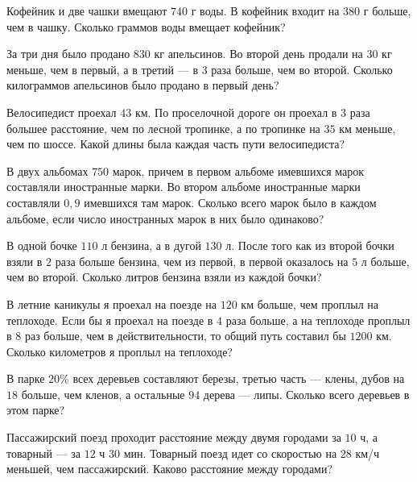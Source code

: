 \begin{consultation}
	\begin{listofex}
		\item Кофейник и две чашки вмещают \(740\) г воды. В кофейник входит на \(380\) г больше, чем в чашку. Сколько граммов воды вмещает кофейник?
		
		\item За три дня было продано \(830\) кг апельсинов. Во второй день продали на \(30\) кг меньше, чем в первый, а в третий --- в \(3\) раза больше, чем во второй. Сколько килограммов апельсинов было продано в первый день? 
		
		\item Велосипедист проехал \(43\) км. По проселочной дороге он проехал в \(3\) раза большее расстояние, чем по лесной тропинке, а по тропинке на \(35\) км меньше, чем по шоссе. Какой длины была каждая часть пути велосипедиста?
		
		\item В двух альбомах \(750\) марок, причем в первом альбоме имевшихся марок составляли иностранные марки. Во втором альбоме иностранные марки составляли \(0,9\) имевшихся там марок. Сколько всего марок было в каждом альбоме, если число иностранных марок в них было одинаково?
		
		\item В одной бочке \(110\) л бензина, а в дугой \(130\) л. После того как из второй бочки взяли в \(2\) раза больше бензина, чем из первой, в первой оказалось на \(5\) л больше, чем во второй. Сколько литров бензина взяли из каждой бочки? 
		
		\item В летние каникулы я проехал на поезде на \(120\) км больше, чем проплыл на теплоходе. Если бы я проехал на поезде в \(4\) раза больше, а на теплоходе проплыл в \(8\) раз больше, чем в действительности, то общий путь составил бы \(1200\) км. Сколько километров я проплыл на теплоходе?
		
		\item В парке \(20\%\) всех деревьев составляют березы, третью часть --- клены, дубов на \(18\) больше, чем кленов, а остальные \(94\) дерева --- липы. Сколько всего деревьев в этом парке? 
		
		\item Пассажирский поезд проходит расстояние между двумя городами за \(10\) ч, а товарный --- за \(12\) ч \(30\) мин. Товарный поезд идет со скоростью на \(28\) км/ч меньшей, чем пассажирский. Каково расстояние между городами?
	\end{listofex}
\end{consultation}
